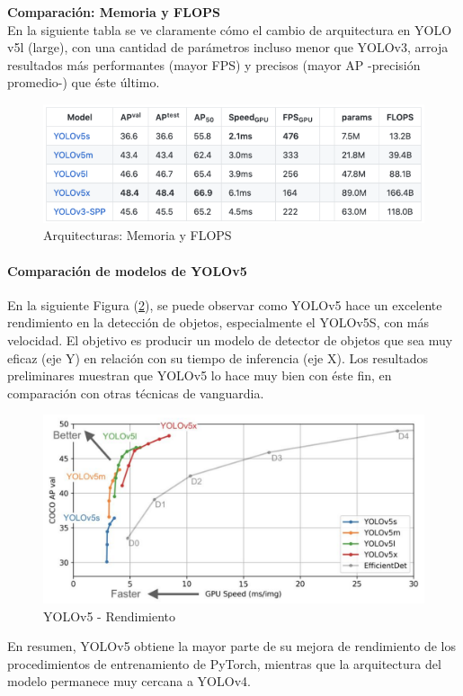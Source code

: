 \textbf{Comparación: Memoria y FLOPS} \\

En la siguiente tabla se ve claramente cómo el cambio de arquitectura en YOLO v5l (large), con una cantidad de parámetros incluso menor que YOLOv3, arroja resultados más performantes (mayor FPS) y precisos (mayor AP -precisión promedio-) que éste último.

\begin{figure}[h!]
    \centering
    \includegraphics[width=1\textwidth]{img/tablaFLOPS.png}
    \caption{Arquitecturas: Memoria y FLOPS}
    \label{fig:tabla flops}
\end{figure}

\paragraph{Comparación de modelos de YOLOv5}
En la siguiente Figura (\ref{fig:yolo-v5-comparacion}), se puede observar como YOLOv5 hace un excelente rendimiento en la detección de objetos, especialmente el YOLOv5S, con más velocidad.
El objetivo es producir un modelo de detector de objetos que sea muy eficaz (eje Y) en relación con su tiempo de inferencia (eje X). Los resultados preliminares muestran que YOLOv5 lo hace muy bien con éste fin, en comparación con otras técnicas de vanguardia.

\begin{figure}[h!]
    \centering
    \includegraphics[width=1\textwidth]{img/Yolov5.png}
    \caption{YOLOv5 - Rendimiento}
    \label{fig:yolo-v5-comparacion}
\end{figure}

En resumen, YOLOv5 obtiene la mayor parte de su mejora de rendimiento de los procedimientos de entrenamiento de PyTorch, mientras que la arquitectura del modelo permanece muy cercana a YOLOv4.

\newpage
